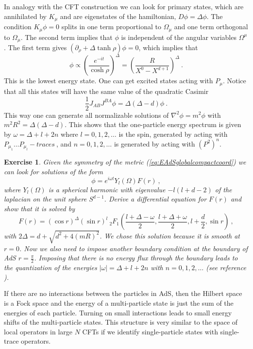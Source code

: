 \documentclass{ws-rv9x6}
\newtheorem{exercise}{Exercise}[section]
\newcommand\be{\begin{equation}}
\newcommand\ee{\end{equation}}
\begin{document}
In analogy with the CFT construction we can look for primary states,
which are annihilated by $K_{\mu}$ and are eigenstates of the hamiltonian,
$D\phi=\Delta\phi$. The condition $K_{\mu}\phi=0$ splits in one
term proportional to $\Omega_{\mu}$ and one term orthogonal to $\Omega_{\mu}$.
The second term implies that $\phi$ is independent of the angular
variables $\Omega^{\mu}$. The first term gives $\left(\partial_{\rho}+\Delta\tanh\rho\right)\phi=0$,
which implies that 
\begin{equation}
\phi\propto\left(\frac{e^{-it}}{\cosh\rho}\right)^{\Delta}=\left(\frac{R}{X^{0}-X^{d+1}}\right)^{\Delta}\ .\label{eq:groundstateWFinAdS}
\end{equation}
This is the lowest energy state. One can get excited states acting
with $P_{\mu}$. Notice that all this states will have the same value
of the quadratic Casimir 
\be
\frac{1}{2}J_{AB}J^{BA}\phi=\Delta(\Delta-d)\phi\ .
\ee
This way one can generate all normalizable solutions of $\nabla^{2}\phi=m^{2}\phi$
with $m^{2}R^{2}=\Delta(\Delta-d)$. This shows that the one-particle
energy spectrum is given by $\omega=\Delta+l+2n$ where $l=0,1,2,\dots$
is the spin, generated by acting with $P_{\mu_{1}}\dots P_{\mu_{l}}-traces\ $,
and $n=0,1,2,\dots$ is generated by acting with $\left(P^{2}\right)^{n}$.

\begin{exercise}
Given the symmetry of the metric (\ref{eq:EAdSglobalcompactcoord})
we can look for solutions of the form 
\be
\phi=e^{i\omega t}Y_{l}(\Omega)F(r)\ ,
\ee
where $Y_{l}(\Omega)$ is a spherical harmonic with eigenvalue $-l(l+d-2)$
of the laplacian on the unit sphere $S^{d-1}$. Derive a differential
equation for $F(r)$ and show that it is solved by 
\be
F(r)=\left(\cos r\right)^{\Delta}\left(\sin r\right)^{l}\ _{2}F_{1}\left(\frac{l+\Delta-\omega}{2},\frac{l+\Delta+\omega}{2},l+\frac{d}{2},\sin r\right)\ ,
\ee
with $2\Delta=d+\sqrt{d^{2}+4(mR)^{2}}$. We chose this solution because
it is smooth at $r=0$. Now we also need to impose another boundary
condition at the boundary of AdS $r=\frac{\pi}{2}$. Imposing that
there is no energy flux through the boundary leads to the quantization
of the energies $|\omega|=\Delta+l+2n$ with $n=0,1,2,\dots$ (see reference 
\cite{hep-th/9905111}).
\end{exercise}



If there are no interactions between the particles in AdS, then the
Hilbert space is a Fock space and the energy of a multi-particle state
is just the sum of the energies of each particle. Turning on small
interactions leads to small energy shifts of the multi-particle states.
This structure is very similar to the space of local operators in
large $N$ CFTs if we identify single-particle states with single-trace
operators.
\end{document}
